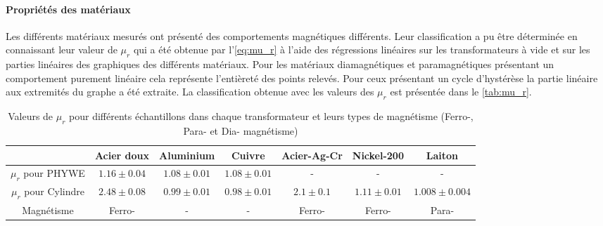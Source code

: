 \paragraph{Propriétés des matériaux}
Les différents matériaux mesurés ont présenté des comportements magnétiques différents. Leur classification a pu être déterminée en connaissant leur valeur de \(\mu_r\) qui a été obtenue par l'\autoref{eq:mu_r} à l'aide des régressions linéaires sur les transformateurs à vide et sur les parties linéaires des graphiques des différents matériaux. Pour les matériaux diamagnétiques et paramagnétiques présentant un comportement purement linéaire cela représente l'entièreté des points relevés. Pour ceux présentant un cycle d'hystérèse la partie linéaire aux extremités du graphe a été extraite. La classification obtenue avec les valeurs des \(\mu_r\) est présentée dans le \autoref{tab:mu_r}.

\begin{table}[h]
    \vspace{5pt}
    \centering
    \begin{tabulary}{\linewidth}{c c c c c c c}
        \toprule
        & Acier doux & Aluminium & Cuivre & Acier-Ag-Cr & Nickel-200 & Laiton \\
        \midrule
        \(\mu_r\) pour PHYWE & \(1.16 \pm 0.04\) & \(1.08 \pm 0.01\) & \(1.08 \pm 0.01\) & - & - & - \\
        \(\mu_r\) pour Cylindre & \(2.48 \pm 0.08\) & \(0.99 \pm 0.01\) & \(0.98 \pm 0.01\) & \(2.1 \pm 0.1\) & \(1.11 \pm 0.01\) & \(1.008 \pm 0.004\) \\
        Magnétisme & Ferro- & - & - & Ferro- & Ferro- & Para- \\
        \bottomrule
    \end{tabulary}
    \caption{Valeurs de \(\mu_r\) pour différents échantillons dans chaque transformateur et leurs types de magnétisme (Ferro-, Para- et Dia- magnétisme)}
    \label{tab:mu_r}
\end{table}


